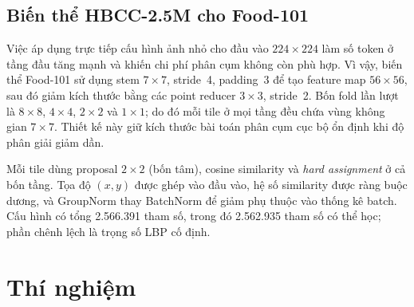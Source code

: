 \documentclass[conference]{IEEEtran}
\begin{document}
\subsection{Biến thể HBCC-2.5M cho Food-101}
\label{ssec:food_arch}

Việc áp dụng trực tiếp cấu hình ảnh nhỏ cho đầu vào
$224\!\times\!224$ làm số token ở tầng đầu tăng mạnh và khiến chi phí
phân cụm không còn phù hợp. Vì vậy, biến thể Food-101 sử dụng stem
$7\!\times\!7$, stride~4, padding~3 để tạo feature map
$56\!\times\!56$, sau đó giảm kích thước bằng các point reducer
$3\!\times\!3$, stride~2. Bốn fold lần lượt là
$8\!\times\!8$, $4\!\times\!4$, $2\!\times\!2$ và $1\!\times\!1$;
do đó mỗi tile ở mọi tầng đều chứa vùng không gian
$7\!\times\!7$. Thiết kế này giữ kích thước bài toán phân cụm cục bộ
ổn định khi độ phân giải giảm dần.

Mỗi tile dùng proposal $2\!\times\!2$ (bốn tâm), cosine similarity
và \emph{hard assignment} ở cả bốn tầng. Tọa độ $(x,y)$ được ghép vào
đầu vào, hệ số similarity được ràng buộc dương, và GroupNorm thay
BatchNorm để giảm phụ thuộc vào thống kê batch. Cấu hình có tổng 2.566.391 tham số, trong đó 2.562.935 tham số có thể học;
phần chênh lệch là trọng số LBP cố định.
\begin{table}[ht!]
  \caption{Cấu hình HBCC-2.5M cho Food-101. $d$: số block;
           $C$: embed dim; $h\!\times\!d_h$: số head và head dim.}
  \label{tab:food_stages}
  \centering
  \renewcommand{\arraystretch}{1.12}
\end{table}
\section{Thí nghiệm}
\label{sec:experiments}
\end{document}
